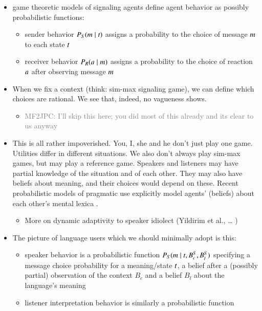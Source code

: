 \documentclass[fleqn,reqno,10pt]{article}
\begin{document}
\begin{itemize}
\item game theoretic models of signaling agents define agent behavior as possibly probabilistic
  functions:
  \begin{itemize}
  \item sender behavior $P_S(m \mid t)$ assigns a probability to the choice of message
    $m$ to each state $t$
  \item receiver behavior $P_R(a \mid m)$ assigns a probability to the choice of
    reaction $a$ after observing message $m$
  \end{itemize}
\item When we fix a context (think: sim-max signaling game), we can define which choices are
  rational. We see that, indeed, no vagueness shows.
  \begin{itemize}
  \item \textcolor{gray}{MF2JPC: I'll skip this here; you did most of this already and its
      clear to us anyway}
  \end{itemize}
\item This is all rather impoverished. You, I, she and he don't just play one game. Utilities
  differ in different situations. We also don't always play sim-max games, but may play a
  reference game. Speakers and listeners may have partial knowledge of the situation and of
  each other. They may also have beliefs about meaning, and their choices would depend on
  these. Recent probabilistic models of pragmatic use explicitly model agents' (beliefs) about
  each other's mental lexica
  \citep{BergenLevy2012:Thats-what-she-,BergenLevy2014:Pragmatic-Reaso,PottsLassiter2016:Embedded-implic}.
  \begin{itemize}
  \item More on dynamic adaptivity to speaker idiolect (Yildirim et al., \dots
    \citet{Davidson_1986:Derangement})
  \end{itemize}
\item The picture of language users which we should minimally adopt is this:
  \begin{itemize}
  \item speaker behavior is a probabilistic function $P_S(m \mid t, B^S_c, B^S_l)$
    specifying a message choice probability for a meaning/state $t$, a belief after a
    (possibly partial) observation of the context $B_c$ and a belief $B_l$ about the language's
    meaning
  \item listener interpretation behavior is similarly a probabilistic function

\end{itemize}
\end{itemize}
\end{document}
